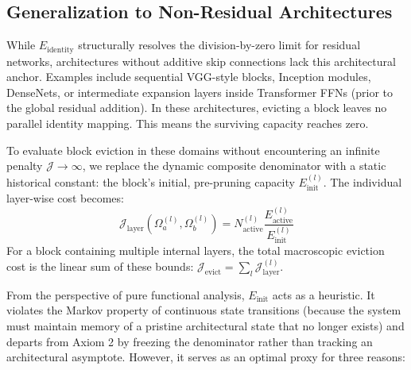 \documentclass[11pt, a4paper, copyright, gdm]{google}
\newcommand{\calJ}{\mathcal{J}}
\theoremstyle{definition}
\begin{document}
\subsection{Generalization to Non-Residual Architectures}
While $E_{\text{identity}}$ structurally resolves the division-by-zero limit for residual networks, architectures without additive skip connections lack this architectural anchor. Examples include sequential VGG-style blocks, Inception modules, DenseNets, or intermediate expansion layers inside Transformer FFNs (prior to the global residual addition). In these architectures, evicting a block leaves no parallel identity mapping. This means the surviving capacity reaches zero.

To evaluate block eviction in these domains without encountering an infinite penalty $\calJ \to \infty$, we replace the dynamic composite denominator with a static historical constant: the block's initial, pre-pruning capacity $E_{\text{init}}^{(l)}$. The individual layer-wise cost becomes:
\begin{equation}
    \calJ_{\text{layer}}(\Omega_a^{(l)}, \Omega_b^{(l)}) = N_{\text{active}}^{(l)} \frac{E_{\text{active}}^{(l)}}{E_{\text{init}}^{(l)}}
\end{equation}
For a block containing multiple internal layers, the total macroscopic eviction cost is the linear sum of these bounds: $\calJ_{\text{evict}} = \sum_l \calJ_{\text{layer}}^{(l)}$. 

From the perspective of pure functional analysis, $E_{\text{init}}$ acts as a heuristic. It violates the Markov property of continuous state transitions (because the system must maintain memory of a pristine architectural state that no longer exists) and departs from Axiom 2 by freezing the denominator rather than tracking an architectural asymptote. However, it serves as an optimal proxy for three reasons:
\end{document}

